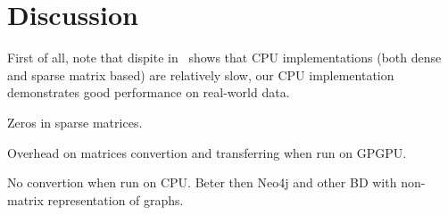 \section{Discussion}

First of all, note that dispite in~\cite{in:2019:ECP:3327964.3328503} shows that CPU implementations (both dense and sparse matrix based) are relatively slow, our CPU implementation demonstrates good performance on real-world data.

Zeros in sparse matrices.

Overhead on matrices convertion and transferring when run on GPGPU.

No convertion when run on CPU. Beter then Neo4j and other BD with non-matrix representation of graphs.
